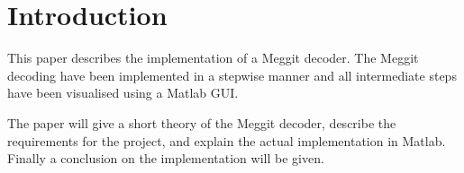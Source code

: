 \documentclass[MiniProjectMain]{subfiles}
\begin{document}
\chapter{Introduction}
This paper describes the implementation of a Meggit decoder.
The Meggit decoding have been implemented in a stepwise manner and all intermediate steps have been visualised using a Matlab GUI. 

The paper will give a short theory of the Meggit decoder, describe the requirements for the project, and explain the actual implementation in Matlab.
Finally a conclusion on the implementation will be given.
\end{document}

